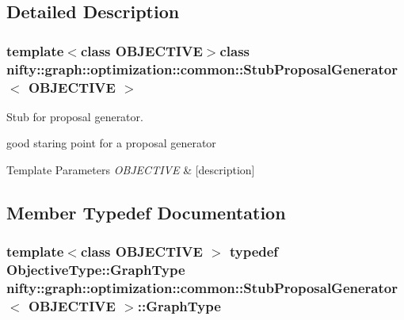 \subsection{Detailed Description}
\subsubsection*{template$<$class O\+B\+J\+E\+C\+T\+I\+V\+E$>$class nifty\+::graph\+::optimization\+::common\+::\+Stub\+Proposal\+Generator$<$ O\+B\+J\+E\+C\+T\+I\+V\+E $>$}

Stub for proposal generator. 

good staring point for a proposal generator


\begin{DoxyTemplParams}{Template Parameters}
{\em O\+B\+J\+E\+C\+T\+I\+V\+E} & \mbox{[}description\mbox{]} \\
\hline
\end{DoxyTemplParams}


\subsection{Member Typedef Documentation}
\hypertarget{classnifty_1_1graph_1_1optimization_1_1common_1_1StubProposalGenerator_ad5d7c98b50ccddc5ce4fbd83b2ca3214}{}
\subsubsection[{Graph\+Type}]{\setlength{\rightskip}{0pt plus 5cm}template$<$class O\+B\+J\+E\+C\+T\+I\+V\+E $>$ typedef Objective\+Type\+::\+Graph\+Type {\bf nifty\+::graph\+::optimization\+::common\+::\+Stub\+Proposal\+Generator}$<$ O\+B\+J\+E\+C\+T\+I\+V\+E $>$\+::{\bf Graph\+Type}}\label{classnifty_1_1graph_1_1optimization_1_1common_1_1StubProposalGenerator_ad5d7c98b50ccddc5ce4fbd83b2ca3214}
\hypertarget{classnifty_1_1graph_1_1optimization_1_1common_1_1StubProposalGenerator_ae7d0ffc1c09e62f40d0dbee2ae7ae5d7}{}
